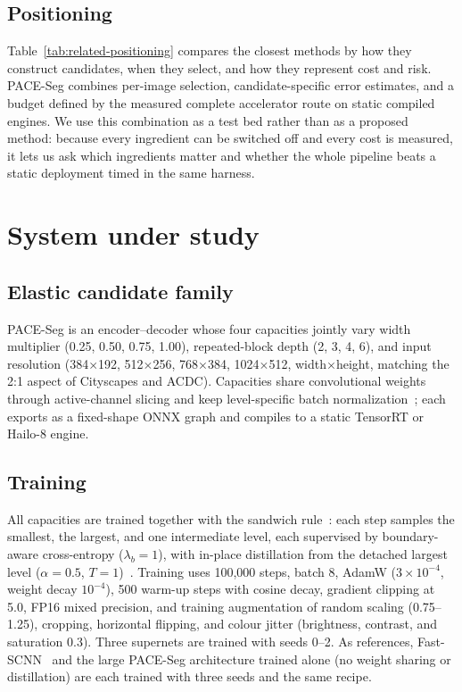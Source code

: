 \documentclass[a4paper,5p]{elsarticle}
\newcommand{\method}{PACE-Seg}
\begin{document}
\subsection{Positioning}

Table~\ref{tab:related-positioning} compares the closest methods by how they construct candidates, when they select, and how they represent cost and risk. \method{} combines per-image selection, candidate-specific error estimates, and a budget defined by the measured complete accelerator route on static compiled engines. We use this combination as a test bed rather than as a proposed method: because every ingredient can be switched off and every cost is measured, it lets us ask which ingredients matter and whether the whole pipeline beats a static deployment timed in the same harness.

\section{System under study}
\label{sec:method}

\subsection{Elastic candidate family}

\method{} is an encoder--decoder whose four capacities jointly vary width multiplier (0.25, 0.50, 0.75, 1.00), repeated-block depth (2, 3, 4, 6), and input resolution (384$\times$192, 512$\times$256, 768$\times$384, 1024$\times$512, width$\times$height, matching the 2:1 aspect of Cityscapes and ACDC). Capacities share convolutional weights through active-channel slicing and keep level-specific batch normalization~\cite{yu2019slimmable}; each exports as a fixed-shape ONNX graph and compiles to a static TensorRT or Hailo-8 engine.

\subsection{Training}

All capacities are trained together with the sandwich rule~\cite{yu2019usnet}: each step samples the smallest, the largest, and one intermediate level, each supervised by boundary-aware cross-entropy ($\lambda_b=1$), with in-place distillation from the detached largest level ($\alpha=0.5$, $T=1$)~\cite{hinton2015distilling}. Training uses 100,000 steps, batch 8, AdamW ($3\times10^{-4}$, weight decay $10^{-4}$), 500 warm-up steps with cosine decay, gradient clipping at 5.0, FP16 mixed precision, and training augmentation of random scaling (0.75--1.25), cropping, horizontal flipping, and colour jitter (brightness, contrast, and saturation 0.3). Three supernets are trained with seeds 0--2. As references, Fast-SCNN~\cite{poudel2019fastscnn} and the large \method{} architecture trained alone (no weight sharing or distillation) are each trained with three seeds and the same recipe.
\end{document}
